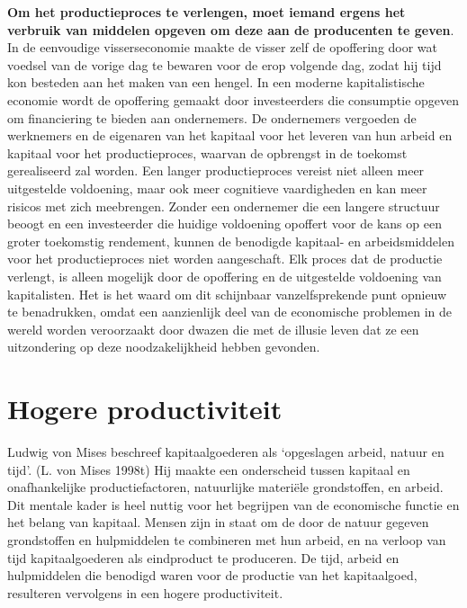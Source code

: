 \documentclass[
  a5paper,
  smalldemyvopaper,11pt,twoside,onecolumn,openright,extrafontsizes,
hidelinks]{memoir}
\begin{document}
\textbf{Om het productieproces te verlengen, moet iemand ergens het
verbruik van middelen opgeven om deze aan de producenten te geven}. In
de eenvoudige visserseconomie maakte de visser zelf de opoffering door
wat voedsel van de vorige dag te bewaren voor de erop volgende dag,
zodat hij tijd kon besteden aan het maken van een hengel. In een moderne
kapitalistische economie wordt de opoffering gemaakt door investeerders
die consumptie opgeven om financiering te bieden aan ondernemers. De
ondernemers vergoeden de werknemers en de eigenaren van het kapitaal
voor het leveren van hun arbeid en kapitaal voor het productieproces,
waarvan de opbrengst in de toekomst gerealiseerd zal worden. Een langer
productieproces vereist niet alleen meer uitgestelde voldoening, maar
ook meer cognitieve vaardigheden en kan meer risicos met zich
meebrengen. Zonder een ondernemer die een langere structuur beoogt en
een investeerder die huidige voldoening opoffert voor de kans op een
groter toekomstig rendement, kunnen de benodigde kapitaal- en
arbeidsmiddelen voor het productieproces niet worden aangeschaft. Elk
proces dat de productie verlengt, is alleen mogelijk door de opoffering
en de uitgestelde voldoening van kapitalisten. Het is het waard om dit
schijnbaar vanzelfsprekende punt opnieuw te benadrukken, omdat een
aanzienlijk deel van de economische problemen in de wereld worden
veroorzaakt door dwazen die met de illusie leven dat ze een uitzondering
op deze noodzakelijkheid hebben gevonden.

\section{Hogere productiviteit}\label{hogere-productiviteit}

Ludwig von Mises beschreef kapitaalgoederen als `opgeslagen arbeid,
natuur en tijd'. (L. von Mises 1998t) Hij maakte een onderscheid tussen
kapitaal en onafhankelijke productiefactoren, natuurlijke materiële
grondstoffen, en arbeid. Dit mentale kader is heel nuttig voor het
begrijpen van de economische functie en het belang van kapitaal. Mensen
zijn in staat om de door de natuur gegeven grondstoffen en hulpmiddelen
te combineren met hun arbeid, en na verloop van tijd kapitaalgoederen
als eindproduct te produceren. De tijd, arbeid en hulpmiddelen die
benodigd waren voor de productie van het kapitaalgoed, resulteren
vervolgens in een hogere productiviteit.
\end{document}
